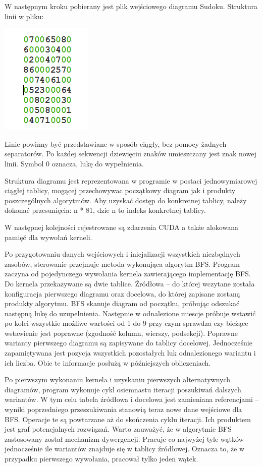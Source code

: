 \documentclass[a4paper,12pt]{article}
\begin{document}
W następnym kroku pobierany jest plik wejściowego diagramu Sudoku. Struktura linii w pliku:

\begin{center}
  \includegraphics[scale=0.75]{p3.png}  
  \label{fig:picture}
\end{center}


Linie powinny być przedstawiane w sposób ciągły, bez pomocy żadnych separatorów. Po każdej sekwencji dziewięciu znaków umieszczany jest znak nowej linii. Symbol 0 oznacza, lukę do wypełnienia.

Struktura diagramu jest reprezentowana w programie w postaci jednowymiarowej ciągłej tablicy, mogącej przechowywac początkowy diagram jak i produkty poszczególnych algorytmów. Aby uzyskać dostęp do konkretnej tablicy, należy dokonać przesunięcia:
n * 81, dzie n to indeks konkretnej tablicy.

W następnej kolejności rejestrowane są zdarzenia CUDA a także alokowana pamięć dla wywołań kerneli.

Po przygotowaniu danych wejściowych i inicjalizacji wszystkich niezbędnych zasobów, sterowanie przejmuje metoda wykonująca algorytm BFS. Program zaczyna od pojedynczego wywołania kernela zawierającego implementację BFS. Do kernela przekazywane są dwie tablice. Źródłowa – do której wczytane została konfiguracja pierwszego diagramu oraz docelowa, do której zapisane zostaną produkty algorytmu. BFS skanuje diagram od początku, próbując odszukać następną lukę do uzupełnienia. Następnie w odnalezione miescje próbuje wstawić po kolei wszystkie możliwe wartości od 1 do 9 przy czym sprawdza czy bieżące wstawienie jest poprawne (zgodność kolumn, wierszy, podsekcji). Poprawne warianty pierwszego diagramu są zapisywane do tablicy docelowej. Jednocześnie zapamiętywana jest pozycja wszystkich pozostałych luk odnalezionego wariantu i ich liczba. Obie te informacje posłużą w późniejszych obliczeniach. 

Po pierwszym wykonaniu kernela i uzyskaniu pierwszych alternatywnych diagramów, program wykonuje cykl osiemnastu iteracji poszukiwań dalszych wariantów. W tym celu tabela źródłowa i docelowa jest zamieniana referencjami – wyniki poprzedniego przeszukiwania stanowią teraz nowe dane wejściowe dla BFS. Operacje te są powtarzane aż do skończenia cyklu iteracji. Ich produktem jest graf potencjalnych rozwiązań. Warto zauważyć, że w algorytmie BFS zastosowany został mechanizm dywergencji. Pracuje co najwyżej tyle wątków jednocześnie ile wariantów znajduje się w tablicy źródłowej. Oznacza to, że w przypadku pierwszego wywołania, pracował tylko jeden wątek.
\end{document}
